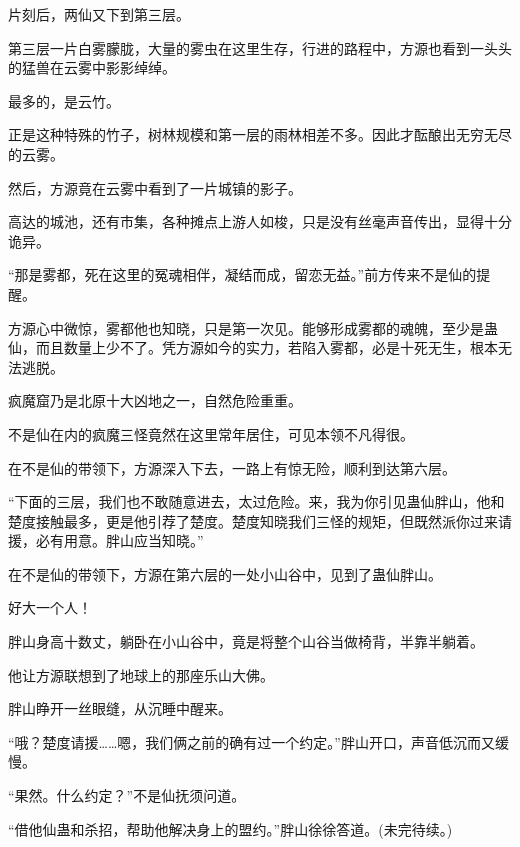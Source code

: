 \begin{this_body}
片刻后，两仙又下到第三层。

第三层一片白雾朦胧，大量的雾虫在这里生存，行进的路程中，方源也看到一头头的猛兽在云雾中影影绰绰。

最多的，是云竹。

正是这种特殊的竹子，树林规模和第一层的雨林相差不多。因此才酝酿出无穷无尽的云雾。

然后，方源竟在云雾中看到了一片城镇的影子。

高达的城池，还有市集，各种摊点上游人如梭，只是没有丝毫声音传出，显得十分诡异。

“那是雾都，死在这里的冤魂相伴，凝结而成，留恋无益。”前方传来不是仙的提醒。

方源心中微惊，雾都他也知晓，只是第一次见。能够形成雾都的魂魄，至少是蛊仙，而且数量上少不了。凭方源如今的实力，若陷入雾都，必是十死无生，根本无法逃脱。

疯魔窟乃是北原十大凶地之一，自然危险重重。

不是仙在内的疯魔三怪竟然在这里常年居住，可见本领不凡得很。

在不是仙的带领下，方源深入下去，一路上有惊无险，顺利到达第六层。

“下面的三层，我们也不敢随意进去，太过危险。来，我为你引见蛊仙胖山，他和楚度接触最多，更是他引荐了楚度。楚度知晓我们三怪的规矩，但既然派你过来请援，必有用意。胖山应当知晓。”

在不是仙的带领下，方源在第六层的一处小山谷中，见到了蛊仙胖山。

好大一个人！

胖山身高十数丈，躺卧在小山谷中，竟是将整个山谷当做椅背，半靠半躺着。

他让方源联想到了地球上的那座乐山大佛。

胖山睁开一丝眼缝，从沉睡中醒来。

“哦？楚度请援……嗯，我们俩之前的确有过一个约定。”胖山开口，声音低沉而又缓慢。

“果然。什么约定？”不是仙抚须问道。

“借他仙蛊和杀招，帮助他解决身上的盟约。”胖山徐徐答道。(未完待续。)

\end{this_body}

